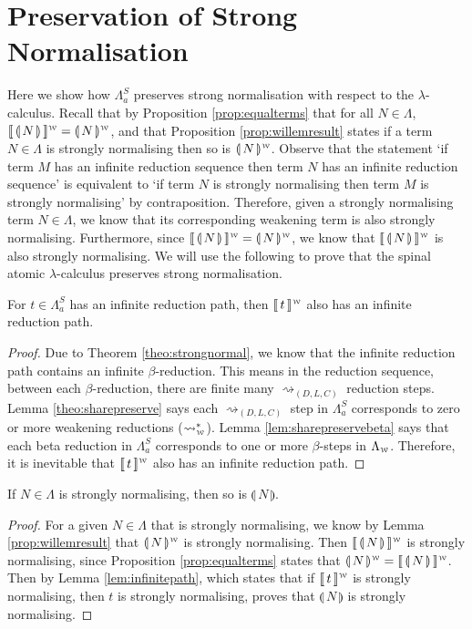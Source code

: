 \documentclass[a4paper,UKenglish,cleveref, autoref]{lipics-v2019}
\newcommand{\FALC}{\Lambda^{S}_{a}}
\newcommand{\WEAK}{\Lambda_{\weaksymbol}}
\newcommand{\compile}[1]{\llparenthesis \, #1 \, \rrparenthesis}
\newcommand{\weaksymbol}{\mbox{\tiny $\mathcal{W}$}}
\newcommand{\compweak}[1]{\llparenthesis \, #1 \, \rrparenthesis^{\weaksymbol}}
\newcommand{\composeweak}[1]{\llbracket \, #1 \, \rrbracket^{\weaksymbol}}
\begin{document}
\section{Preservation of Strong Normalisation}
\label{chap:posn}

Here we show how $\FALC$ preserves strong normalisation with respect to the $\lambda$-calculus. Recall that by Proposition \ref{prop:equalterms} that for all $N \in \Lambda$, $\composeweak{\compile{N}} = \compweak{N}$, and that Proposition \ref{prop:willemresult} states if a term $N \in \Lambda$ is strongly normalising then so is $\compweak{N}$. Observe that the statement `if term $M$ has an infinite reduction sequence then term $N$ has an infinite reduction sequence' is equivalent to `if term $N$ is strongly normalising then term $M$ is strongly normalising' by contraposition. Therefore, given a strongly normalising term $N \in \Lambda$, we know that its corresponding weakening term is also strongly normalising. Furthermore, since $\composeweak{\compile{N}} = \compweak{N}$, we know that $\composeweak{\compile{N}}$ is also strongly normalising. We will use the following to prove that the spinal atomic $\lambda$-calculus preserves strong normalisation.

\begin{lemma}
\label{lem:infinitepath}
For $t \in \FALC$ has an infinite reduction path, then $\composeweak{t}$ also has an infinite reduction path.
\end{lemma}

\begin{proof}
Due to Theorem \ref{theo:strongnormal}, we know that the infinite reduction path contains an infinite $\beta$-reduction. This means in the reduction sequence, between each $\beta$-reduction, there are finite many $\rightsquigarrow_{(D, L, C)}$ reduction steps. Lemma \ref{theo:sharepreserve} says each $\rightsquigarrow_{(D, L, C)}$ step in $\FALC$ corresponds to zero or more weakening reductions ($\rightsquigarrow^{*}_{\weaksymbol}$). Lemma \ref{lem:sharepreservebeta} says that each beta reduction in $\FALC$ corresponds to one or more $\beta$-steps in $\WEAK$. Therefore, it is inevitable that $\composeweak{t}$ also has an infinite reduction path.
\end{proof}

\begin{theorem}
 If $N \in \Lambda$ is strongly normalising, then so is $\compile{N}$.
\end{theorem}

\begin{proof}
For a given $N \in \Lambda$ that is strongly normalising, we know by Lemma \ref{prop:willemresult} that $\compweak{N}$ is strongly normalising. Then $\composeweak{\compile{N}}$ is strongly normalising, since Proposition \ref{prop:equalterms} states that $\compweak{N} = \composeweak{\compile{N}}$. Then by Lemma \ref{lem:infinitepath}, which states that if $\composeweak{t}$ is strongly normalising, then $t$ is strongly normalising, proves that $\compile{N}$ is strongly normalising.
\end{proof}
\end{document}
